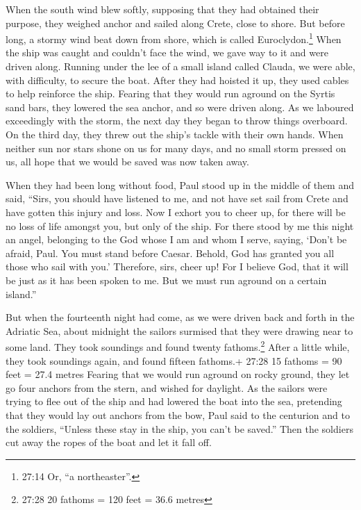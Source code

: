  When the south wind blew softly, supposing that they had
obtained their purpose, they weighed anchor and sailed along Crete,
close to shore.  But before long, a stormy wind beat down
from shore, which is called Euroclydon.\footnote{27:14 Or, ``a
  northeaster''.}  When the ship was caught and couldn't
face the wind, we gave way to it and were driven along. 
Running under the lee of a small island called Clauda, we were able,
with difficulty, to secure the boat.  After they had
hoisted it up, they used cables to help reinforce the ship. Fearing that
they would run aground on the Syrtis sand bars, they lowered the sea
anchor, and so were driven along.  As we laboured
exceedingly with the storm, the next day they began to throw things
overboard.  On the third day, they threw out the ship's
tackle with their own hands.  When neither sun nor stars
shone on us for many days, and no small storm pressed on us, all hope
that we would be saved was now taken away.

 When they had been long without food, Paul stood up in the
middle of them and said, ``Sirs, you should have listened to me, and not
have set sail from Crete and have gotten this injury and loss.
 Now I exhort you to cheer up, for there will be no loss of
life amongst you, but only of the ship.  For there stood by
me this night an angel, belonging to the God whose I am and whom I
serve,  saying, `Don't be afraid, Paul. You must stand
before Caesar. Behold, God has granted you all those who sail with you.'
 Therefore, sirs, cheer up! For I believe God, that it will
be just as it has been spoken to me.  But we must run
aground on a certain island.''

 But when the fourteenth night had come, as we were driven
back and forth in the Adriatic Sea, about midnight the sailors surmised
that they were drawing near to some land.  They took
soundings and found twenty fathoms.\footnote{27:28 20 fathoms = 120 feet
  = 36.6 metres} After a little while, they took soundings again, and
found fifteen fathoms.+ 27:28 15 fathoms = 90 feet = 27.4 metres
 Fearing that we would run aground on rocky ground, they
let go four anchors from the stern, and wished for daylight.
 As the sailors were trying to flee out of the ship and had
lowered the boat into the sea, pretending that they would lay out
anchors from the bow,  Paul said to the centurion and to
the soldiers, ``Unless these stay in the ship, you can't be saved.''
 Then the soldiers cut away the ropes of the boat and let
it fall off.

